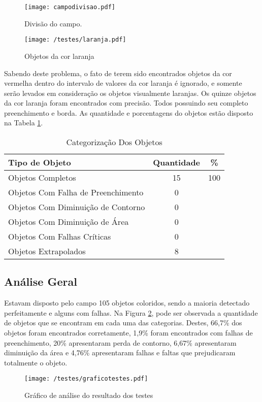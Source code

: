 		\begin{figure}[H]
			\begin{minipage}[b]{0.45\linewidth}
				\centering
				\texttt{[image: campodivisao.pdf]}
				\caption{Divisão do campo.}				
			\end{minipage}
			\hspace{0.5cm}
			\begin{minipage}[b]{0.45\linewidth}
				\centering
				\texttt{[image: /testes/laranja.pdf]}
				\caption{Objetos da cor laranja}
				\label{fig:laranja}
			\end{minipage}
		\end{figure}
	Sabendo deste problema, o fato de terem sido encontrados objetos da cor vermelha dentro do intervalo de valores da cor laranja é ignorado, e somente serão levados em consideração os objetos visualmente laranjas.
	Os quinze objetos da cor laranja foram encontrados com precisão. Todos possuindo seu completo preenchimento e borda. As quantidade e porcentagens do objetos estão disposto na Tabela \ref{tab:laranja}.
	
\begin{table}[H]
\centering
\begin{tabular}{l|c|c}
Tipo de Objeto & Quantidade  & \% \\ %
\hline                               %
Objetos Completos &  15 & 100 \\
\hline 
Objetos Com Falha de Preenchimento & 0 \\
\hline 
Objetos Com Diminuição de Contorno &  0 \\
\hline 
Objetos Com Diminuição de Área &  0 \\
\hline 
Objetos Com Falhas Críticas & 0 \\
\hline \hline 
Objetos Extrapolados & 8 \\
\hline 
\end{tabular}
\caption{Categorização Dos Objetos}
\label{tab:laranja}
\end{table}
\newpage
\subsection{Análise Geral}
Estavam disposto pelo campo 105 objetos coloridos, sendo a maioria detectado perfeitamente e alguns com falhas. Na Figura \ref{fig:total}, pode ser observada a quantidade de objetos que se encontram em cada uma das categorias. Destes, 66,7\% dos objetos foram encontrados corretamente, 1,9\% foram encontrados com falhas de preenchimento, 20\% apresentaram perda de contorno, 6,67\% apresentaram diminuição da área e 4,76\% apresentaram falhas e faltas que prejudicaram totalmente o objeto.
	\begin{figure}[H]
		\centering
		\texttt{[image: /testes/graficotestes.pdf]}
		\caption{Gráfico de análise do resultado dos testes}
		\label{fig:total}
	\end{figure}
	
